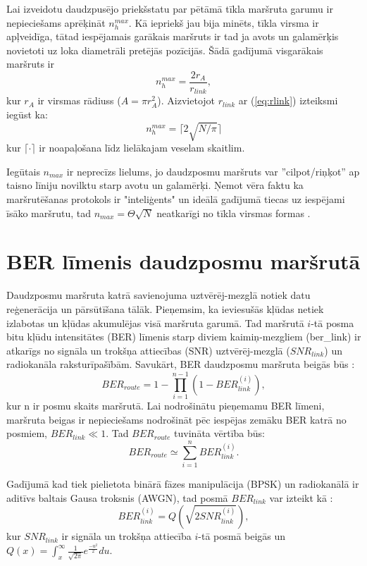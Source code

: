 Lai izveidotu daudzpusējo priekšstatu par pētāmā tīkla maršruta garumu ir nepieciešams aprēķināt $n^{max}_{h}$. Kā iepriekš jau bija minēts, tīkla virsma ir apļveidīga, tātad iespējamais garākais maršruts ir tad ja avots un galamērķis novietoti uz loka diametrāli pretējās pozīcijās. Šādā gadījumā visgarākais maršruts ir
\begin{equation}
n^{max}_{h}=\frac{2r_{A}}{r_{link}},
\end{equation}
kur $r_{A}$ ir virsmas rādiuss ($A=\pi r_{A}^2$). Aizvietojot $r_{link}$ ar (\ref{eq:rlink}) izteiksmi iegūst ka:
\begin{equation}
n^{max}_{h}=\lceil 2\sqrt{N/\pi}\rceil
\end{equation}
kur $\lceil\cdot\rceil$ ir noapaļošana līdz lielākajam veselam skaitlim.

Iegūtais $n_{max}$ ir neprecīzs lielums, jo daudzposmu maršruts var ''cilpot/riņķot'' ap taisno līniju novilktu starp avotu un galamērķi. Ņemot vēra faktu ka maršrutēšanas protokols ir "inteliģents" un ideālā gadījumā tiecas uz iespējami īsāko maršrutu, tad $n_{max}=\Theta\sqrt{N}$ neatkarīgi no tīkla virsmas formas \cite{cormen}.

\section{BER līmenis daudzposmu maršrutā}\label{sec:BER}
Daudzposmu maršruta katrā savienojuma uztvērēj-mezglā notiek datu reģenerācija un pārsūtīšana tālāk. Pieņemsim, ka ieviesušās kļūdas netiek izlabotas un kļūdas akumulējas visā maršruta garumā. Tad maršrutā $i$-tā posma bitu kļūdu intensitātes (\acs{BER}) līmenis starp diviem kaimiņ-mezgliem (\gls{ber_link}) ir atkarīgs no  signāla un trokšņa attiecības (\acs{SNR}) uztvērēj-mezglā ($SNR_{link}$) un radiokanāla raksturīpašībām. Savukārt, BER daudzposmu maršruta beigās būs \cite{qoS_static}:
\begin{equation}
BER_{route} = 1- \prod^{n-1}_{i=1}(1-BER_{link}^{(i)}),
\label{eq:BER_routeProd}
\end{equation}
kur n ir posmu skaits maršrutā. Lai nodrošinātu pieņemamu BER līmeni, maršruta beigas ir nepieciešams nodrošināt pēc iespējas zemāku BER katrā no posmiem,  $BER_{link} \ll 1$. Tad $BER_{route}$ tuvināta vērtība būs:
\begin{equation}
 BER_{route} \simeq \sum_{i=1}^{n}BER_{link}^{(i)}.
\label{eq:BER_route}
\end{equation}

Gadījumā kad tiek pielietota binārā fāzes manipulācija (\acs{BPSK}) un radiokanālā ir aditīvs baltais Gausa troksnis (\acs{AWGN}), tad posmā $BER_{link}$ var izteikt kā \cite{qoS_static}:
\begin{equation}
 BER_{link}^{(i)}=Q(\sqrt{2SNR_{link}^{(i)}}),
\end{equation}
kur $SNR_{link}$ ir signāla un trokšņa attiecība $i$-tā posmā beigās un $Q(x)=\int^\infty_x\frac{1}{\sqrt{2\pi}}e^{\frac{-u^2}{2}}du$.


